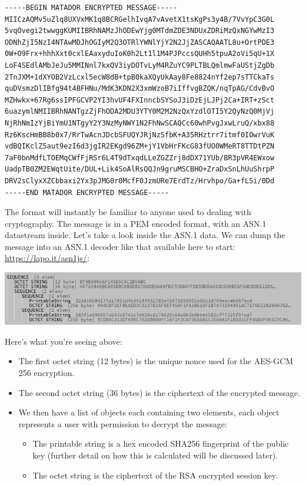 \documentclass{article}[12pt]
\begin{document}
		\begin{lstlisting}[language={}]
-----BEGIN MATADOR ENCRYPTED MESSAGE-----
MIICzAQMv5uZlq8UXVxMK1q8BCRGelhIvqA7vAvetX1tsKgPs3y4B/7VvYpC3G0L
5vqOvegi2twwggKUMIIBRhNAMzJhODEwYjg0MTdmZDE3NDUxZDRiMzQxNGYwMzI3
ODNhZjI5NzI4NTAwMDJhOGIyM2Q3OTRlYWNlYjY2N2JjZASCAQAATL8u+OrtPDE3
0W+O9Frx+hhhXxt0cxlEAaxyduIoK0h2Lt1l1M4PJPccsQUHh5tpuA2oVi5qU+1X
LoF4SEdlAMbJeJu5MMINnl7kxQV3iyDOTvLyM4RZuYC9PLTBLQmlmwFaUStjZgDb
2TnJXM+1dXYOB2VzLcxl5ecW8dB+tpB0kaXQyUkAay8Fe8824nYf2ep7sTTCkaTs
quDVsmzDlIBfg94t4BFHNu/MdK3KDN2X3xmWzoB7iIffvgBZQK/nqTpAG/CdvBvO
MZHwkx+67Rg6ssIPFGCVP2YI3hvUF4FXInncbSYSoJ3iDzEjLJPj2Ca+IRT+zSct
6uazymlNMIIBRhNANTgzZjFhODA2MDU3YTY0M2M2NzQxYzdlOTI5Y2QyNzQ0MjVj
NjRhNmIzYjBiYmU1NTgyY2Y3NzMyNWY1N2FhNwSCAQCc60whPvgJxwLruQ/xbx88
Rz6KscHmBB8b0x7/RrTwAcnJDcbSFUQYJRjNzSfbK+A35RHztrr7itmf0IOwrVuK
vdBQIKclZ5aut9ezI6d3jgIR2EKgd96ZM+jY1VbHrFKcG83fUO0WMeRT8TTDtPZN
7aF0bnMdfLTOEMqCWfFjRSr6L4T9dTxqdLLeZGZZrj8dDX71YUb/BR3pVR4EWxow
UadpTB0ZM2EWqtUite/DUL+Lik4SoAlRsQQJn9gruMSCBHO+ZraDxSnLhUuShrpP
DRV2sClyxXZCbbaxi2Yx3pJMG0r0McfF0JzmURe7ErdTz/Hrvhpo/Ga+fLSi/0Dd
-----END MATADOR ENCRYPTED MESSAGE-----
		\end{lstlisting}
		
		The format will instantly be familiar to anyone used to dealing with cryptography. The message is in a PEM encoded format, with an ASN.1 datastream inside. Let's take a look inside the ASN.1 data. We can dump the message into an ASN.1 decoder like that available here to start: \url{https://lapo.it/asn1js/}:
		
		\includegraphics[width=15cm]{encryptedmessageasn1.png}
		
		Here's what you're seeing above:
		
		\begin{itemize}
			\item The first octet string (12 bytes) is the unique nonce used for the AES-GCM 256 encryption.
			\item The second octet string (36 bytes) is the ciphertext of the encrypted message.
			\item We then have a list of objects each containing two elements, each object represents a user with permission to decrypt the message:
			\begin{itemize}
				\item The printable string is a hex encoded SHA256 fingerprint of the public key (further detail on how this is calculated will be discussed later).
				\item The octet string is the ciphertext of the RSA encrypted session key.
			\end{itemize}
		\end{itemize}
	
\end{document}
